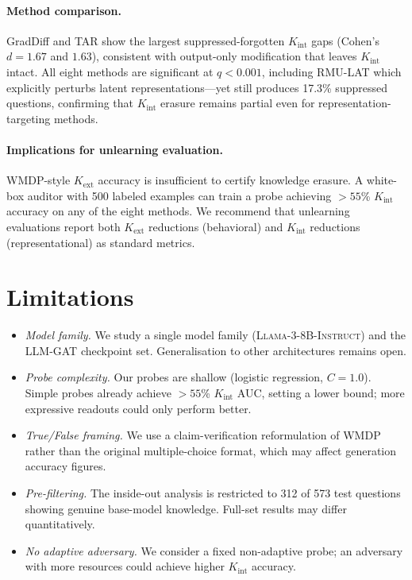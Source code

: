 \documentclass[11pt]{article}
\begin{document}
\paragraph{Method comparison.}
GradDiff and TAR show the largest suppressed-forgotten $K_\text{int}$ gaps
(Cohen's $d = 1.67$ and $1.63$), consistent with output-only modification that
leaves $K_\text{int}$ intact.
All eight methods are significant at $q < 0.001$, including RMU-LAT which
explicitly perturbs latent representations---yet still produces 17.3\%
suppressed questions, confirming that $K_\text{int}$ erasure remains partial
even for representation-targeting methods.

\paragraph{Implications for unlearning evaluation.}
WMDP-style $K_\text{ext}$ accuracy is insufficient to certify knowledge erasure.
A white-box auditor with 500 labeled examples can train a probe achieving
${>}55$\% $K_\text{int}$ accuracy on any of the eight methods.
We recommend that unlearning evaluations report both $K_\text{ext}$ reductions
(behavioral) and $K_\text{int}$ reductions (representational) as standard metrics.

\section*{Limitations}

\begin{itemize}[leftmargin=1.5em, itemsep=2pt]
    \item \emph{Model family.}
    We study a single model family (\textsc{Llama-3-8B-Instruct}) and the
    LLM-GAT checkpoint set. Generalisation to other architectures remains open.

    \item \emph{Probe complexity.}
    Our probes are shallow (logistic regression, $C=1.0$).
    Simple probes already achieve ${>}55$\% $K_\text{int}$ AUC, setting a lower
    bound; more expressive readouts could only perform better.

    \item \emph{True/False framing.}
    We use a claim-verification reformulation of WMDP rather than the original
    multiple-choice format, which may affect generation accuracy figures.

    \item \emph{Pre-filtering.}
    The inside-out analysis is restricted to 312 of 573 test questions showing
    genuine base-model knowledge. Full-set results may differ quantitatively.

    \item \emph{No adaptive adversary.}
    We consider a fixed non-adaptive probe; an adversary with more resources
    could achieve higher $K_\text{int}$ accuracy.
\end{itemize}
\end{document}
